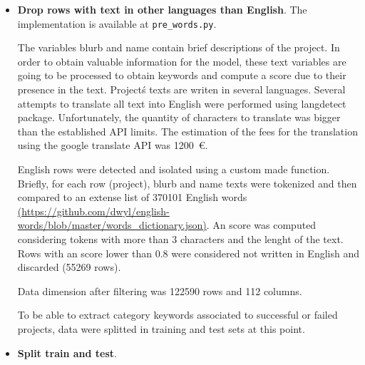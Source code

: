 \documentclass{article}
\begin{document}
\begin{itemize}
\begin{itemize}
	The number of columns was reduced to 125.
	
	\item  Currency pruning.
	The implementation is available at {\tt pre\_currency\_pruning.py }.
	
	Currency encodes 14 different levels. Count plots and percentages of succesfull projects were computed for tha variable 'currency\_orig'. Currencies with more than 55\% of successful projects were retained (GBP, HKD, SGD, JPY) and compared to the retained countries. All currency levels were dropped because the selected currencies correspond to countries that were already selected and the information was redundant.
	
	The number of columns was reduced to 112.
        
    \end{itemize}
    \item \textbf{Drop rows with text in other languages than English}.
    The implementation is available at {\tt pre\_words.py}.
    
    The variables blurb and name contain brief descriptions of the project. In order to obtain valuable information for the model, these text variables are going to be processed to obtain keywords and compute a score due to their presence in the text. Project\'s texts are writen in several languages. Several attempts to translate all text into English were performed using langdetect package. Unfortunately, the quantity of characters to translate was bigger than the established API limits. The estimation of the fees for the translation using the google translate API was 1200~\euro.
    
    English rows were detected and isolated using a custom made function. Briefly, for each row (project), blurb and name texts were tokenized and then compared to an extense list of 370101 English words \url{(https://github.com/dwyl/english-words/blob/master/words_dictionary.json)}. An score was computed considering tokens with more than 3 characters and the lenght of the text. Rows with an score lower than 0.8 were considered not written in English and discarded (55269 rows).
    
    Data dimension after filtering was 122590 rows and 112 columns.
    
    To be able to extract category keywords associated to successful or failed projects, data were splitted in training and test sets at this point.
    
    \item \textbf{Split train and test}.
    

\end{itemize}
\end{document}
